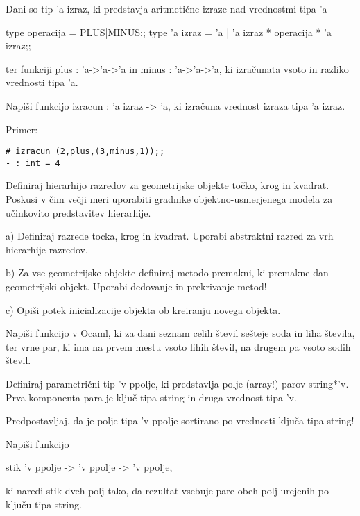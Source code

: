 \begin{ex}
  Dani so tip 'a izraz, ki predstavja aritmeti\v cne izraze nad
  vrednostmi tipa 'a

  type operacija = PLUS|MINUS;;
  type 'a izraz = 'a | 'a izraz * operacija * 'a izraz;;

  ter funkciji plus : 'a->'a->'a in minus : 'a->'a->'a, ki izra\v
  cunata vsoto in razliko vrednosti tipa 'a.

  Napi\v si funkcijo izracun : 'a izraz -> 'a, ki izra\v cuna vrednost
  izraza tipa 'a izraz.

\noindent\/Primer:
\begin{verbatim}
# izracun (2,plus,(3,minus,1));;
- : int = 4
\end{verbatim} 

\end{ex} \begin{ex}
Definiraj hierarhijo razredov za geometrijske objekte to\v cko, krog in kvadrat. Poskusi v \v cim ve\v cji meri uporabiti gradnike objektno-usmerjenega modela za u\v cinkovito predstavitev hierarhije. 

a) Definiraj razrede tocka, krog in kvadrat. Uporabi abstraktni razred za vrh hierarhije razredov.

b) Za vse geometrijske objekte definiraj metodo premakni, ki premakne dan geometrijski objekt. Uporabi dedovanje in prekrivanje metod!

c) Opi\v si potek inicializacije objekta ob kreiranju novega objekta.

\end{ex} \begin{ex}
Napi\v si funkcijo v Ocaml, ki za dani seznam celih \v stevil se\v steje soda in liha \v stevila, ter vrne par, ki ima na prvem mestu vsoto lihih \v stevil, na drugem pa vsoto sodih \v stevil.


\end{ex} \begin{ex}
Definiraj parametri\v cni tip 'v ppolje, ki predstavlja polje (array!) parov string*'v. Prva komponenta para je klju\v c tipa string in druga vrednost tipa 'v. 

Predpostavljaj, da je polje tipa 'v ppolje sortirano po vrednosti klju\v ca tipa string!  

Napi\v si funkcijo

stik 'v ppolje -> 'v ppolje -> 'v ppolje, 

ki naredi stik dveh polj tako, da rezultat vsebuje pare obeh polj urejenih po klju\v cu tipa string. 



\end{ex}
